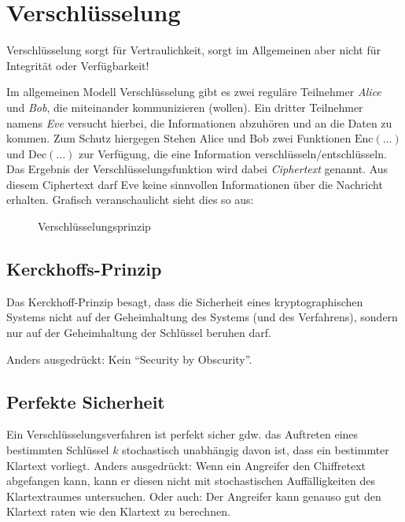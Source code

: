 \documentclass[a4paper, 11pt, accentcolor = tud3b]{tudreport}
\newcommand{\Enc}{\ensuremath{\textrm{Enc}}}
\newcommand{\Dec}{\ensuremath{\textrm{Dec}}}
\newcommand{\people}{%
	\node [scale = 2.5, label = above:{Alice}, alice] (alice) {};
	\node [scale = 2.5, right = 4 of alice, label = above:{Eve}, criminal, evil] (eve) {};
	\node [scale = 2.5, right = 4 of eve, label = above:{Bob}, bob] (bob) {};
}
\begin{document}
    \chapter{Verschlüsselung} %
        Verschlüsselung sorgt für Vertraulichkeit, sorgt im Allgemeinen aber nicht für Integrität oder Verfügbarkeit!
        
        Im allgemeinen Modell Verschlüsselung gibt es zwei reguläre Teilnehmer \textit{Alice} und \textit{Bob}, die miteinander kommunizieren (wollen). Ein dritter Teilnehmer namens \textit{Eve} versucht hierbei, die Informationen abzuhören und an die Daten zu kommen. Zum Schutz hiergegen Stehen Alice und Bob zwei Funktionen \( \Enc(\dots) \) und \( \Dec(\dots) \) zur Verfügung, die eine Information verschlüsseln/entschlüsseln. Das Ergebnis der Verschlüsselungsfunktion wird dabei \textit{Ciphertext} genannt. Aus diesem Ciphertext darf Eve keine sinnvollen Informationen über die Nachricht erhalten. Grafisch veranschaulicht sieht dies so aus:
        \begin{figure}[H]
        	\centering
        	\caption{Verschlüsselungsprinzip}
        \end{figure}

        \section{Kerckhoffs-Prinzip}
            Das Kerckhoff-Prinzip besagt, dass die Sicherheit eines kryptographischen Systems nicht auf der Geheimhaltung des Systems (und des Verfahrens), sondern nur auf der Geheimhaltung der Schlüssel beruhen darf.
            
            Anders ausgedrückt: Kein \enquote{Security by Obscurity}.
        
        \section{Perfekte Sicherheit}
	        Ein Verschlüsselungsverfahren ist perfekt sicher gdw. das Auftreten eines bestimmten Schlüssel \(k\) stochastisch unabhängig davon ist, dass ein bestimmter Klartext vorliegt. Anders ausgedrückt: Wenn ein Angreifer den Chiffretext abgefangen kann, kann er diesen nicht mit stochastischen Auffälligkeiten des Klartextraumes untersuchen. Oder auch: Der Angreifer kann genauso gut den Klartext raten wie den Klartext zu berechnen.
	        
\end{document}

